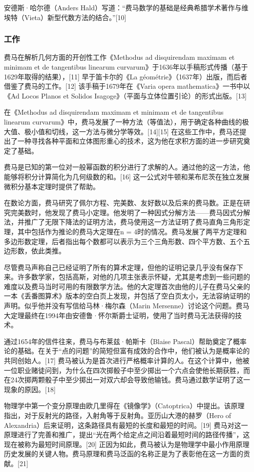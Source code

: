 安德斯·哈尔德（Anders Hald）写道：“费马数学的基础是经典希腊学术著作与维埃特（Vieta）新型代数方法的结合。”[10]
\subsubsection{工作}
费马在解析几何方面的开创性工作《Methodus ad disquirendam maximam et minimam et de tangentibus linearum curvarum》于1636年以手稿形式传播（基于1629年取得的结果），[11] 早于笛卡尔的《La géométrie》（1637年）出版，而后者借鉴了费马的工作。[12] 该手稿于1679年在《Varia opera mathematica》一书中以《Ad Locos Planos et Solidos Isagoge》（平面与立体位置引论）的形式出版。[13]

在《Methodus ad disquirendam maximam et minimam et de tangentibus linearum curvarum》中，费马发展了一种方法（等值法），用于确定各种曲线的极大值、极小值和切线，这一方法与微分学等效。[14][15] 在这些工作中，费马还提出了一种寻找各种平面和立体图形重心的技术，这为他在求积方面的进一步研究奠定了基础。

费马是已知的第一位对一般幂函数的积分进行了求解的人。通过他的这一方法，他能够将积分计算简化为几何级数的和。[16] 这一公式对牛顿和莱布尼茨在独立发展微积分基本定理时提供了帮助。

在数论方面，费马研究了佩尔方程、完美数、友好数以及后来的费马数。正是在研究完美数时，他发现了费马小定理。他发明了一种因式分解方法——费马因式分解法，并推广了无限下降法的证明方法，费马使用这一方法证明了费马直角三角形定理，其中包括作为推论的费马大定理在n = 4时的情况。费马发展了两平方定理和多边形数定理，后者指出每个数都可以表示为三个三角形数、四个平方数、五个五边形数，依此类推。

尽管费马声称自己已经证明了所有的算术定理，但他的证明记录几乎没有保存下来。许多数学家，包括高斯，对他的几项主张表示怀疑，尤其是考虑到一些问题的难度以及费马当时可用的有限数学方法。他的大定理首次由他的儿子在费马父亲的一本《丢番图算术》版本的空白页上发现，并包括了空白页太小，无法容纳证明的声明。似乎他并没有写信给马林·梅尔森（Marin Mersenne）讨论这个问题。费马大定理最终在1994年由安德鲁·怀尔斯爵士证明，使用了当时费马无法获得的技术。

通过1654年的信件往来，费马与布莱兹·帕斯卡（Blaise Pascal）帮助奠定了概率论的基础。在关于“点的问题”的简短但富有成效的合作中，他们被认为是概率论的共同创始人。[17] 费马被认为是首次进行严格概率计算的人。在这个计算中，他被一位职业赌徒问到，为什么在四次掷骰子中至少掷出一个六点会使他长期获胜，而在24次掷两颗骰子中至少掷出一对双六却会导致他输钱。费马通过数学证明了这一现象的原因。[18]

物理学中第一个变分原理由欧几里得在《镜像学》（Catoptrica）中提出。该原理指出，对于反射光的路径，入射角等于反射角。亚历山大港的赫罗（Hero of Alexandria）后来证明，这条路径具有最短的长度和最短的时间。[19] 费马对这一原理进行了完善和推广，提出“光在两个给定点之间沿着最短时间的路径传播”，这现在被称为最短时间原理。[20] 正因为如此，费马被认为是物理学中最小作用原理历史发展的关键人物。费马原理和费马泛函的名称正是为了表彰他在这一方面的贡献。[21]
